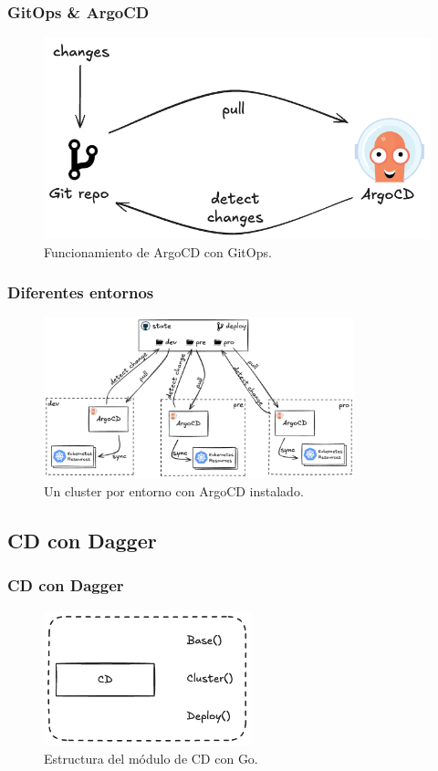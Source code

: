 \documentclass{beamer}
\begin{document}
\begin{frame}
    \frametitle{GitOps \& ArgoCD}
    \begin{figure}
        \includegraphics[scale=0.35]{figuras/argocd-simple}
        \caption{Funcionamiento de ArgoCD con GitOps.}
    \end{figure}
\end{frame}

\begin{frame}
    \frametitle{Diferentes entornos}
    \begin{figure}
        \includegraphics[width=9cm]{figuras/clusters}
        \caption{Un cluster por entorno con ArgoCD instalado.}
    \end{figure}
\end{frame}

\subsection{CD con Dagger}
\begin{frame}
    \frametitle{CD con Dagger}
    \begin{figure}
        \includegraphics[width=6cm]{figuras/cd_dagger_go}
        \caption{Estructura del módulo de CD con Go.}
    \end{figure}
\end{frame}
\end{document}

